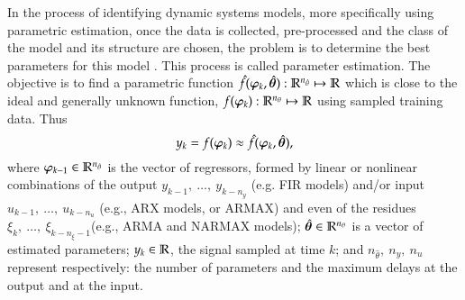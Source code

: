 In the process of identifying dynamic systems models, more specifically using parametric estimation, once the data is collected, pre-processed and the class of the model and its structure are chosen, the problem is to determine the best parameters for this model . This process is called parameter estimation. The objective is to find a parametric function $\hat{f}(\bm{\varphi}_{k},\hat{\bm{\theta}}) :  \mathbb{R}^{n_{\hat{\theta}}} \mapsto \mathbb{R}$ which is close to the ideal and generally unknown function, $f(\bm{\varphi}_{k}) : \mathbb{R}^{n_\theta} \mapsto \mathbb{R}$ using sampled training data. Thus
\begin{equation}
   y_k = f(\bm{\varphi}_{k}) \approx \hat{f}(\bm{\varphi}_{k},\hat{\bm{\theta}}),
\end{equation}
where $\bm{\varphi}_{k-1} \in \mathbb{R}^{n_{\hat{\theta}}}$ is the vector of regressors, formed by linear or nonlinear combinations of the output $y_{k-1},\  \dots ,\ y_{k-n_y}$ (e.g. FIR models) and/or input $u_{k-1},\  \dots ,\ u_{k-n_u}$ (e.g., ARX models, or ARMAX) and even of the residues $\xi_{k},\  \dots ,\ \xi_{k-n_\xi-1}$(e.g., ARMA and NARMAX models); $\hat{\bm{\theta}} \in \mathbb{R}^{n_\theta}$ is a vector of estimated parameters; $y_k \in \mathbb{R}$, the signal sampled at time $k$; and $n_{\hat{\theta}},\ n_y,\ n_u$ represent respectively: the number of parameters and the maximum delays at the output and at the input.

